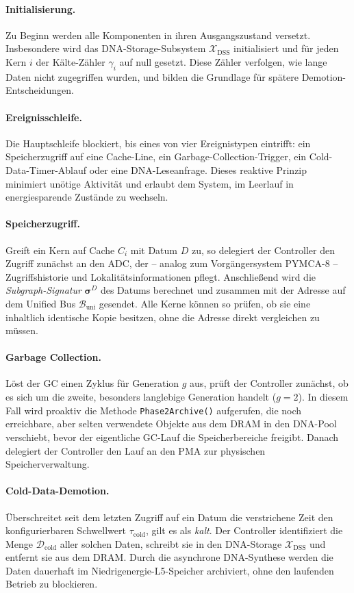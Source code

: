 ﻿\documentclass[a4paper,12pt]{article}
\theoremstyle{definition}
\begin{document}
\paragraph{Initialisierung.}
Zu Beginn werden alle Komponenten in ihren Ausgangszustand versetzt. Insbesondere wird das DNA-Storage-Subsystem $\mathcal{X}_{\mathrm{DSS}}$ initialisiert und für jeden Kern $i$ der Kälte-Zähler $\gamma_i$ auf null gesetzt. Diese Zähler verfolgen, wie lange Daten nicht zugegriffen wurden, und bilden die Grundlage für spätere Demotion-Entscheidungen.

\paragraph{Ereignisschleife.}
Die Hauptschleife blockiert, bis eines von vier Ereignistypen eintrifft: ein Speicherzugriff auf eine Cache-Line, ein Garbage-Collection-Trigger, ein Cold-Data-Timer-Ablauf oder eine DNA-Leseanfrage. Dieses reaktive Prinzip minimiert unötige Aktivität und erlaubt dem System, im Leerlauf in energiesparende Zustände zu wechseln.

\paragraph{Speicherzugriff.}
Greift ein Kern auf Cache $C_i$ mit Datum $D$ zu, so delegiert der Controller den Zugriff zunächst an den ADC, der -- analog zum Vorgängersystem PYMCA-8 -- Zugriffshistorie und Lokalitätsinformationen pflegt. Anschließend wird die \emph{Subgraph-Signatur} $\boldsymbol{\sigma}^D$ des Datums berechnet und zusammen mit der Adresse auf dem Unified Bus $\mathcal{B}_{\mathrm{uni}}$ gesendet. Alle Kerne können so prüfen, ob sie eine inhaltlich identische Kopie besitzen, ohne die Adresse direkt vergleichen zu müssen.

\paragraph{Garbage Collection.}
Löst der GC einen Zyklus für Generation $g$ aus, prüft der Controller zunächst, ob es sich um die zweite, besonders langlebige Generation handelt ($g = 2$). In diesem Fall wird proaktiv die Methode \texttt{Phase2Archive()} aufgerufen, die noch erreichbare, aber selten verwendete Objekte aus dem DRAM in den DNA-Pool verschiebt, bevor der eigentliche GC-Lauf die Speicherbereiche freigibt. Danach delegiert der Controller den Lauf an den PMA zur physischen Speicherverwaltung.

\paragraph{Cold-Data-Demotion.}
Überschreitet seit dem letzten Zugriff auf ein Datum die verstrichene Zeit den konfigurierbaren Schwellwert $\tau_{\mathrm{cold}}$, gilt es als \emph{kalt}. Der Controller identifiziert die Menge $\mathcal{D}_{\mathrm{cold}}$ aller solchen Daten, schreibt sie in den DNA-Storage $\mathcal{X}_{\mathrm{DSS}}$ und entfernt sie aus dem DRAM. Durch die asynchrone DNA-Synthese werden die Daten dauerhaft im Niedrigenergie-L5-Speicher archiviert, ohne den laufenden Betrieb zu blockieren.
\end{document}
